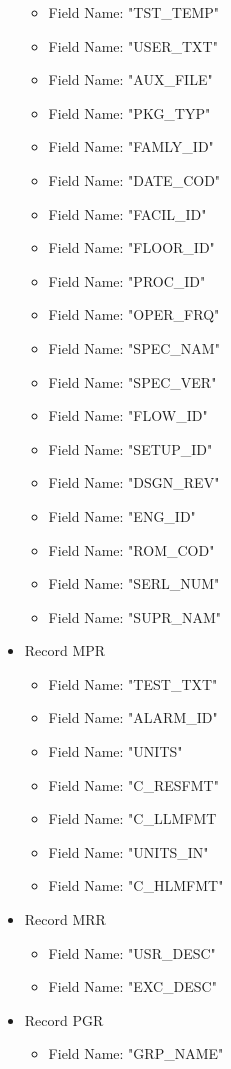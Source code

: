 \documentclass[letterpaper]{article}
\begin{document}
\begin{itemize}
\begin{itemize}
    \item Field Name: "TST\_TEMP"
    \item Field Name: "USER\_TXT"
    \item Field Name: "AUX\_FILE"
    \item Field Name: "PKG\_TYP"
    \item Field Name: "FAMLY\_ID"
    \item Field Name: "DATE\_COD"
    \item Field Name: "FACIL\_ID"
    \item Field Name: "FLOOR\_ID"
    \item Field Name: "PROC\_ID"
    \item Field Name: "OPER\_FRQ"
    \item Field Name: "SPEC\_NAM"
    \item Field Name: "SPEC\_VER"
    \item Field Name: "FLOW\_ID"
    \item Field Name: "SETUP\_ID"
    \item Field Name: "DSGN\_REV"
    \item Field Name: "ENG\_ID"
    \item Field Name: "ROM\_COD"
    \item Field Name: "SERL\_NUM"
    \item Field Name: "SUPR\_NAM"
    \end{itemize}
\item Record MPR
    \begin{itemize}
    \item Field Name: "TEST\_TXT"
    \item Field Name: "ALARM\_ID"
    \item Field Name: "UNITS"
    \item Field Name: "C\_RESFMT"
    \item Field Name: "C\_LLMFMT
    \item Field Name: "UNITS\_IN"
    \item Field Name: "C\_HLMFMT"
    \end{itemize}
\item Record MRR
    \begin{itemize}
    \item Field Name: "USR\_DESC"
    \item Field Name: "EXC\_DESC"
    \end{itemize}
\item Record PGR
    \begin{itemize}
    \item Field Name: "GRP\_NAME"

\end{itemize}
\end{itemize}
\end{document}
